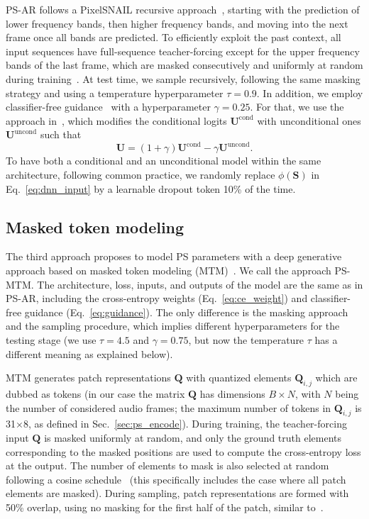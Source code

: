 \documentclass{article}
\newcommand{\ma}[1]{\textbf{#1}}
\begin{document}
PS-AR follows a PixelSNAIL recursive approach~\cite{Chen_2018}, starting with the prediction of lower frequency bands, then higher frequency bands, and moving into the next frame once all bands are predicted. To efficiently exploit the past context, all input sequences have full-sequence teacher-forcing except for the upper frequency bands of the last frame, which are masked consecutively and uniformly at random during training~\cite{Chen_2018}. At test time, we sample recursively, following the same masking strategy and using a temperature hyperparameter $\tau=0.9$. In addition, we employ classifier-free guidance~\cite{Ho_Salimans_2021} with a hyperparameter $\gamma=0.25$. For that, we use the approach in~\cite{Chang_2023}, which modifies the conditional logits $\ma{U}^{\text{cond}}$ with unconditional ones $\ma{U}^{\text{uncond}}$ such that
\begin{equation}
    \ma{U} = (1+\gamma) \ma{U}^{\text{cond}} - \gamma \ma{U}^{\text{uncond}} .
    \label{eq:guidance}
\end{equation}
To have both a conditional and an unconditional model within the same architecture, following common practice, we randomly replace $\phi(\ma{S})$ in Eq.~\ref{eq:dnn_input} by a learnable dropout token 10\% of the time.

\subsection{Masked token modeling}
\label{sec:mtm}

The third approach proposes to model PS parameters with a deep generative approach based on masked token modeling (MTM)~\cite{Chang_2022}. We call the approach PS-MTM. The architecture, loss, inputs, and outputs of the model are the same as in PS-AR, including the cross-entropy weights (Eq.~\ref{eq:ce_weight}) and classifier-free guidance (Eq.~\ref{eq:guidance}). The only difference is the masking approach and the sampling procedure, which implies different hyperparameters for the testing stage (we use $\tau=4.5$ and $\gamma=0.75$, but now the temperature $\tau$ has a different meaning as explained below).

MTM generates patch representations $\ma{Q}$ with quantized elements $\ma{Q}_{i,j}$ which are dubbed as tokens (in our case the matrix $\ma{Q}$ has dimensions $B\times N$, with $N$ being the number of considered audio frames; the maximum number of tokens in $\ma{Q}_{i,j}$ is 31$\times$8, as defined in Sec.~\ref{sec:ps_encode}). During training, the teacher-forcing input $\ma{Q}$ is masked uniformly at random, and only the ground truth elements corresponding to the masked positions are used to compute the cross-entropy loss at the output. The number of elements to mask is also selected at random following a cosine schedule~\cite{Chang_2022} (this specifically includes the case where all patch elements are masked). During sampling, patch representations are formed with 50\% overlap, using no masking for the first half of the patch, similar to~\cite{Chang_2023}.
\end{document}
